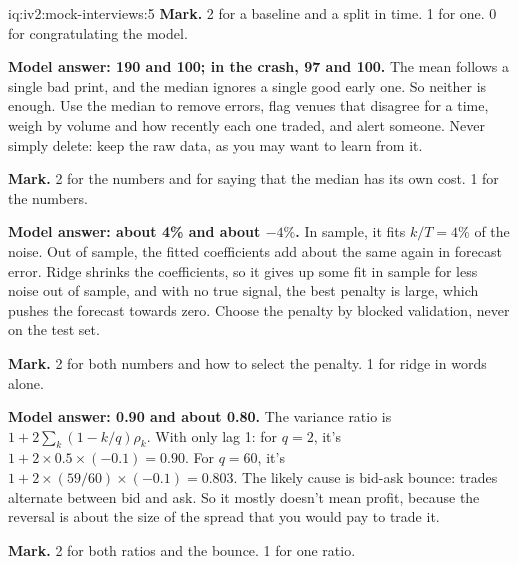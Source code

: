 \begin{solution}{iq:iv2:mock-interviews:5}
\textbf{Mark.} 2 for a baseline and a split in time. 1 for one. 0 for congratulating the model.

\ivstop
\textbf{Model answer: 190 and 100; in the crash, 97 and 100.} The mean follows a single bad print, and the median ignores a single good early one. So neither is enough. Use the median to remove errors, flag venues that disagree for a time, weigh by volume and how recently each one traded, and alert someone. Never simply delete: keep the raw data, as you may want to learn from it.

\textbf{Mark.} 2 for the numbers and for saying that the median has its own cost. 1 for the numbers.

\ivstop
\textbf{Model answer: about 4\% and about $-4\%$.} In sample, it fits $k/T = 4\%$ of the noise. Out of sample, the fitted coefficients add about the same again in forecast error. Ridge shrinks the coefficients, so it gives up some fit in sample for less noise out of sample, and with no true signal, the best penalty is large, which pushes the forecast towards zero. Choose the penalty by blocked validation, never on the test set.

\textbf{Mark.} 2 for both numbers and how to select the penalty. 1 for ridge in words alone.

\ivstop
\textbf{Model answer: 0.90 and about 0.80.} The variance ratio is $1 + 2\sum_{k}(1 - k/q)\rho_k$. With only lag 1: for $q = 2$, it's $1 + 2 \times 0.5 \times (-0.1) = 0.90$. For $q = 60$, it's $1 + 2 \times (59/60) \times (-0.1) = 0.803$. The likely cause is bid-ask bounce: trades alternate between bid and ask. So it mostly doesn't mean profit, because the reversal is about the size of the spread that you would pay to trade it.

\textbf{Mark.} 2 for both ratios and the bounce. 1 for one ratio.


\end{solution}
